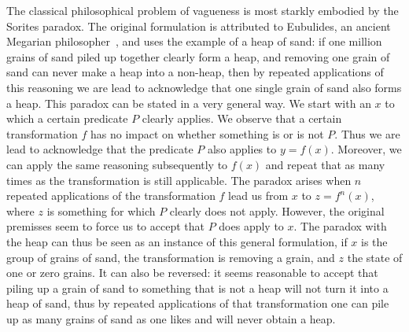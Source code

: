 \documentclass[a4paper]{article}
\begin{document}
The classical philosophical problem of vagueness is most starkly embodied by the Sorites paradox.
The original formulation is attributed to Eubulides, an ancient Megarian philosopher~\citep{sorensen_sorites_2009}, and uses the example of a heap of sand: if one million grains of sand piled up together clearly form a heap, and removing one grain of sand can never make a heap into a non-heap, then by repeated applications of this reasoning we are lead to acknowledge that one single grain of sand also forms a heap.
This paradox can be stated in a very general way.
We start with an $x$ to which a certain predicate $P$ clearly applies.
We observe that a certain transformation $f$ has no impact on whether something is or is not $P$.
Thus we are lead to acknowledge that the predicate $P$ also applies to $y = f(x)$.
Moreover, we can apply the same reasoning subsequently to $f(x)$ and repeat that as many times as the transformation is still applicable.
The paradox arises when $n$ repeated applications of the transformation $f$ lead us from $x$ to $z = f^n(x)$, where $z$ is something for which $P$ clearly does not apply.
However, the original premisses seem to force us to accept that $P$ does apply to $x$.
The paradox with the heap can thus be seen as an instance of this general formulation, if $x$ is the group of grains of sand, the transformation is removing a grain, and $z$ the state of one or zero grains.
It can also be reversed: it seems reasonable to accept that piling up a grain of sand to something that is not a heap will not turn it into a heap of sand, thus 
by repeated applications of that transformation one can pile up as many grains of sand as one likes and will never obtain a heap.
\end{document}
